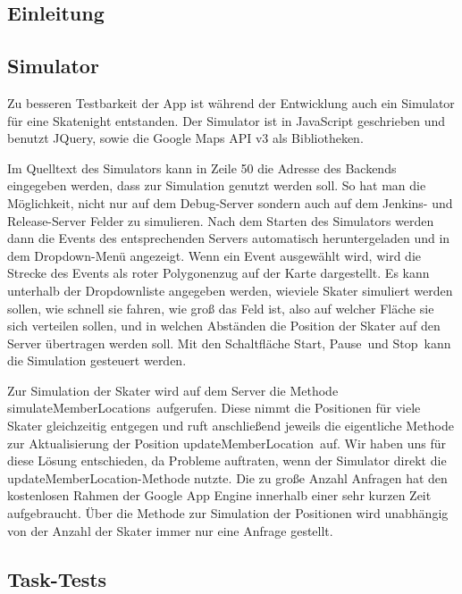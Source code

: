 \subsection{Einleitung}

\subsection{Simulator}
Zu besseren Testbarkeit der App ist während der Entwicklung auch ein Simulator für eine Skatenight entstanden. Der Simulator ist in JavaScript geschrieben und benutzt JQuery, sowie die Google Maps API v3 als Bibliotheken.

Im Quelltext des Simulators kann in Zeile 50 die Adresse des Backends eingegeben werden, dass zur Simulation genutzt werden soll. So hat man die Möglichkeit, nicht nur auf dem Debug-Server sondern auch auf dem Jenkins- und Release-Server Felder zu simulieren. Nach dem Starten des Simulators werden dann die Events des entsprechenden Servers automatisch heruntergeladen und in dem Dropdown-Menü angezeigt. Wenn ein Event ausgewählt wird, wird die Strecke des Events als roter Polygonenzug auf der Karte dargestellt. Es kann unterhalb der Dropdownliste angegeben werden, wieviele Skater simuliert werden sollen, wie schnell sie fahren, wie groß das Feld ist, also auf welcher Fläche sie sich verteilen sollen, und in welchen Abständen die Position der Skater auf den Server übertragen werden soll. Mit den Schaltfläche \glqq Start\grqq, \glqq Pause\grqq\ und \glqq Stop\grqq\ kann die Simulation gesteuert werden.

Zur Simulation der Skater wird auf dem Server die Methode \glqq simulateMemberLocations\grqq\ aufgerufen. Diese nimmt die Positionen für viele Skater gleichzeitig entgegen und ruft anschließend jeweils die eigentliche Methode zur Aktualisierung der Position \glqq updateMemberLocation\grqq\ auf. Wir haben uns für diese Lösung entschieden, da Probleme auftraten, wenn der Simulator direkt die updateMemberLocation-Methode nutzte. Die zu große Anzahl Anfragen hat den kostenlosen Rahmen der Google App Engine innerhalb einer sehr kurzen Zeit aufgebraucht. Über die Methode zur Simulation der Positionen wird unabhängig von der Anzahl der Skater immer nur eine Anfrage gestellt.

\subsection{Task-Tests}

